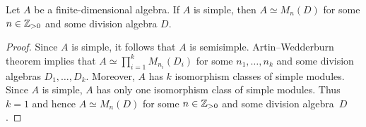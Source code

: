 \begin{theorem}[Wedderburn]
	Let $A$ be a finite-dimensional algebra. If $A$ is simple, then 
	$A\simeq M_n(D)$ for some $n\in\mathbb{Z}_{>0}$ and some division algebra $D$. 
\end{theorem}

\begin{proof}
	Since $A$ is simple, it follows that $A$ is semisimple. Artin--Wedderburn theorem implies that $A\simeq\prod_{i=1}^k M_{n_i}(D_i)$ 
	for some $n_1,\dots,n_k$ and some division algebras $D_1,\dots,D_k$. Moreover, $A$ has 
	$k$ isomorphism classes of simple modules. Since $A$ is simple,
	$A$ has only one isomorphism class of simple modules. Thus $k=1$ and hence 
	$A\simeq M_n(D)$ for some $n\in\mathbb{Z}_{>0}$ and some division algebra~$D$. 
\end{proof}


